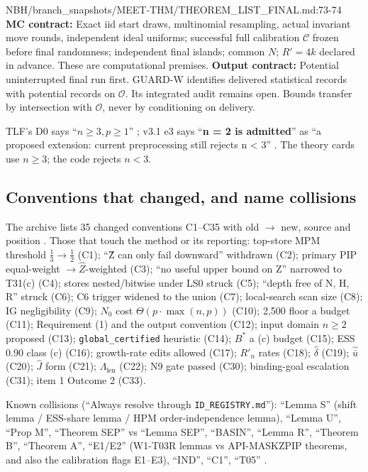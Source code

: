 \begin{stmt}{NBH/branch_snapshots/MEET-THM/THEOREM_LIST_FINAL.md:73-74}
\textbf{MC contract:} Exact iid start draws, multinomial resampling, actual invariant move rounds, independent ideal uniforms; successful full
calibration $\mathcal C$ frozen before final randomness; independent final islands; common $N$; $R'=4k$ declared in advance. These are
computational premises.
\textbf{Output contract:} Potential uninterrupted final run first. GUARD-W identifies delivered statistical records with potential records
on $\mathcal O$. Its integrated audit remains open. Bounds transfer by intersection with $\mathcal O$, never by conditioning on delivery.
\end{stmt}

\begin{uncertain}
TLF's D0 says ``\(n\ge3,p\ge1\)'' ; v3.1 e3 says ``\textbf{n = 2 is
admitted}'' as ``a proposed extension: current preprocessing still rejects n < 3''
. The theory cards use $n\ge3$; the code rejects $n<3$.
\end{uncertain}

\subsection{Conventions that changed, and name collisions}\label{app:notation-changes}

The archive lists 35 changed conventions C1–C35 with old $\to$ new, source and position
. Those that touch the method or its reporting: top-store MPM threshold $\tfrac13\to\tfrac12$
(C1); ``Ẑ can only fail downward'' withdrawn (C2); primary PIP equal-weight $\to\hat Z$-weighted (C3); ``no useful upper bound on Z''
narrowed to T31(c) (C4); stores nested/bitwise under LS0 struck (C5); ``depth free of N, H, R'' struck (C6); C6 trigger widened to the
union (C7); local-search scan size (C8); IG negligibility (C9); $N_0$ cost $\Theta(p\cdot\max(n,p))$ (C10); 2,500 floor a budget (C11);
Requirement (1) and the output convention (C12); input domain $n\ge2$ proposed (C13); \texttt{global\_certified} heuristic (C14);
$B^*$ a (c) budget (C15); ESS 0.90 class (c) (C16); growth-rate edits allowed (C17); $R'_n$ rates (C18); $\hat\delta$ (C19); $\hat{\bar u}$
(C20); $\hat J$ form (C21); $\Lambda_{\mathrm{len}}$ (C22); N9 gate passed (C30); binding-goal escalation (C31); item 1 Outcome 2 (C33).

Known collisions (``Always resolve through \texttt{ID\_REGISTRY.md}''): ``Lemma S'' (shift lemma / ESS-share lemma / HPM
order-independence lemma), ``Lemma U'', ``Prop M'', ``Theorem SEP'' vs ``Lemma SEP'', ``BASIN'', ``Lemma R'', ``Theorem B'', ``Theorem
A'', ``E1/E2'' (W1-T03R lemmas vs API-MASKZPIP theorems, and also the calibration flags E1–E3), ``IND'', ``C1'', ``T05''
.
